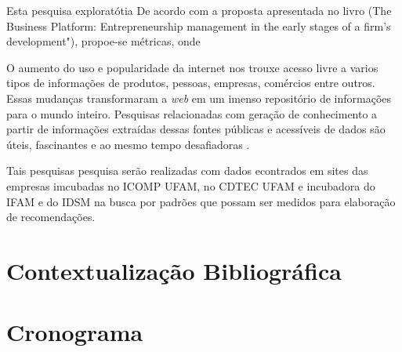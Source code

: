 \documentclass[12pt]{article}
\begin{document}
Esta pesquisa exploratótia 
De acordo com a proposta apresentada no livro (The Business Platform: Entrepreneurship  management in
the early stages of a firm's development"), propoe-se métricas, onde

O aumento do uso e popularidade da internet nos trouxe acesso livre a varios tipos de informações de produtos, pessoas, empresas, comércios entre outros. Essas mudanças transformaram a \textit{web} em um imenso repositório de informações para o mundo inteiro. Pesquisas relacionadas com geração de conhecimento a partir de informações extraídas dessas fontes públicas e acessíveis de dados são úteis, fascinantes e ao mesmo tempo desafiadoras \cite{liu:11}.

Tais pesquisas pesquisa serão realizadas com dados econtrados em sites das empresas imcubadas no ICOMP UFAM, no CDTEC UFAM e incubadora do IFAM e do IDSM na busca por padrões que possam ser medidos para elaboração de recomendações.

\section{Contextualização Bibliográfica} \label{sec:Contex. Bibli}


\section{Cronograma} \label{sec:Crono}
\end{document}
